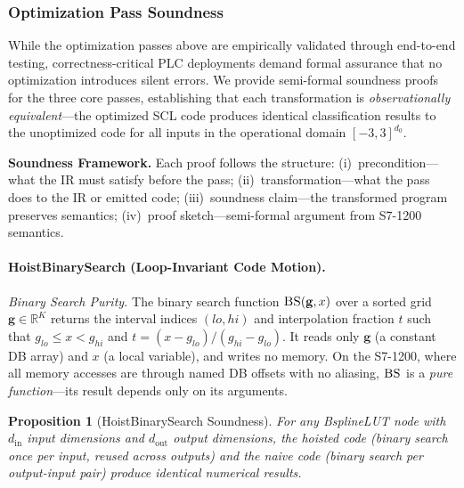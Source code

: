 \documentclass[journal,onecolumn]{IEEEtran}
\newtheorem{proposition}{Proposition}
\begin{document}
\subsubsection{Optimization Pass Soundness}

While the optimization passes above are empirically validated through
end-to-end testing, correctness-critical PLC deployments demand formal
assurance that no optimization introduces silent errors. We provide
semi-formal soundness proofs for the three core passes, establishing that
each transformation is \textit{observationally equivalent}---the optimized
SCL code produces identical classification results to the unoptimized code
for all inputs in the operational domain $[-3,3]^{d_0}$.

\textbf{Soundness Framework.} Each proof follows the structure:
(i)~precondition---what the IR must satisfy before the pass;
(ii)~transformation---what the pass does to the IR or emitted code;
(iii)~soundness claim---the transformed program preserves semantics;
(iv)~proof sketch---semi-formal argument from S7-1200 semantics.

\paragraph{HoistBinarySearch (Loop-Invariant Code Motion).}

\textit{Binary Search Purity.}
The binary search function $\textsc{BS}(\mathbf{g}, x)$ over a sorted grid
$\mathbf{g} \in \mathbb{R}^K$ returns the interval indices $(lo, hi)$ and
interpolation fraction $t$ such that $g_{lo} \leq x < g_{hi}$ and
$t = (x-g_{lo})/(g_{hi}-g_{lo})$. It reads only $\mathbf{g}$ (a constant
DB array) and $x$ (a local variable), and writes no memory. On the
S7-1200, where all memory accesses are through named DB offsets with no
aliasing, $\textsc{BS}$ is a \textit{pure function}---its result depends
only on its arguments.

\begin{proposition}[HoistBinarySearch Soundness]
\label{prop:hoist_sound}
For any BsplineLUT node with $d_{\text{in}}$ input dimensions and
$d_{\text{out}}$ output dimensions, the hoisted code (binary search once
per input, reused across outputs) and the naive code (binary search per
output-input pair) produce identical numerical results.
\end{proposition}
\end{document}
